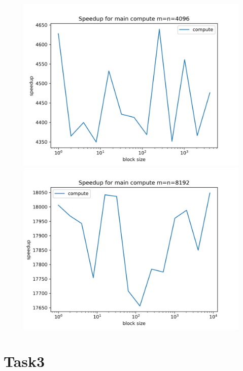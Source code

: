\documentclass[a4paper]{article}
\begin{document}
\begin{figure}[h!]
\begin{minipage}{0.45\linewidth}
			\includegraphics[width=\linewidth]{../float/writeup/compute_plot_m4096.png}
		\end{minipage}%
		\begin{minipage}{0.45\linewidth}
			\centering
			\includegraphics[width=\linewidth]{../float/writeup/compute_plot_m8192.png}
		\end{minipage}
	\end{figure}

		
\section*{Task3}
\end{document}
